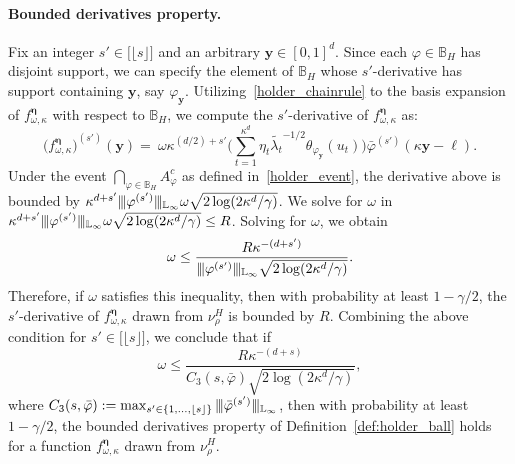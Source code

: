 \documentclass[twoside,11pt]{article}
\newcommand{\floor}[1]{\lfloor #1 \rfloor} %
\newcommand{\vectorize}[1]{\mathbf{#1}}
\newcommand{\dimDensity}{d} %
\newcommand{\smoothness}{s}
\newcommand{\ballRadius}{R}
\newcommand{\ONset}{\mathbb{B}}
\newcommand{\binNum}{\kappa}           %
\newcommand{\coef}{\theta}
\newcommand{\wavMotherUnivIndex}{\ell}
\newcommand{\wavMotherIndex}{\boldsymbol{\wavMotherUnivIndex}}
\newcommand{\domainTs}{
	[0,1]^{{\dimDensity}}
}
\begin{document}
\begin{appendix}
	\paragraph{Bounded derivatives property.}
	Fix an integer $s' \in \bigl[ \lfloor \smoothness \rfloor \bigr]$ and an arbitrary $\vectorize{y} \in \domainTs$.
	Since each $\varphi \in \ONset_{H}$ has disjoint support,
	we can specify the element of $\ONset_{H}$ whose $s'$-derivative has support containing  $\vectorize{y}$,
	say  $\varphi_{\vectorize{y}}$.
	Utilizing~\eqref{holder_chainrule} to the basis expansion of $f^{{\boldsymbol{\eta}}}_{\omega, \binNum}$ with respect to $\ONset_{H}$,
	we compute the $s'$-derivative of $f^{{\boldsymbol{\eta}}}_{\omega, \binNum}$ as:
	\begin{equation*}
		({f^{{\boldsymbol{\eta}}}_{\omega, \binNum})}^{(s')}(\vectorize{y})
		=~
		\omega
		\kappa^{(\dimDensity/2) + s'}
		\biggl(
		\sum_{t=1}^{\binNum^{\dimDensity}}
		\eta_t
		\tilde{\lambda_t}^{-1/2}
		\coef_{\varphi_{\vectorize{y}}}(u_t)
		\biggr)
		\bar{\varphi}
		^{(s')}
		(
		\kappa \vectorize{y} - \wavMotherIndex
		).
	\end{equation*}
	\noindent
	Under the event $\bigcap_{\varphi \in \ONset_H} A_\varphi^c$ as defined in~\eqref{holder_event},
	the derivative above is bounded by $\kappa^{\dimDensity + s'}
	\vert\kern-0.25ex
	\vert\kern-0.25ex
	\vert
	\varphi^{(s')}
	\vert\kern-0.25ex
	\vert\kern-0.25ex
	\vert_{\mathbb{L}_\infty}
	\omega \sqrt{2\log(2{\binNum^{\dimDensity}}/\gamma)}$.
	We solve for \(\omega\) in
	$\kappa^{\dimDensity + s'}
	\vert\kern-0.25ex
	\vert\kern-0.25ex
	\vert
	\varphi^{(s')}
	\vert\kern-0.25ex
	\vert\kern-0.25ex
	\vert_{\mathbb{L}_\infty}
	\omega \sqrt{2\log(2{\binNum^{\dimDensity}}/\gamma)} \leq \ballRadius$. Solving for $\omega$, we obtain
	\begin{equation}
		\omega
		\leq
		\frac{R\kappa^{-(\dimDensity+s')}}
		{
			\vert\kern-0.25ex
			\vert\kern-0.25ex
			\vert
			\varphi^{(s')}
			\vert\kern-0.25ex
			\vert\kern-0.25ex
			\vert_{\mathbb{L}_\infty}
			\sqrt{2\log(2{\binNum^{\dimDensity}}/\gamma)}
		}.
	\end{equation}
	\noindent
	Therefore, if \(\omega\) satisfies this inequality, then with probability at least \(1 - \gamma/2\), the $s'$-derivative of  \(f^{{\boldsymbol{\eta}}}_{\omega, \binNum}\) drawn from \(\nu_\rho^H\) is bounded by $\ballRadius$.
	Combining the above condition for  $s' \in \bigl[ \lfloor \smoothness \rfloor \bigr]$, 
	we conclude that if
	\begin{equation}\label{condition_holder_bounded_deriv}
		\omega \leq \frac{R\kappa^{-(\dimDensity+s)}
		}{
			C_3(\smoothness, \bar{\varphi}) 
			\sqrt{2 \log({2\binNum^{\dimDensity}}/\gamma)}},	
	\end{equation}
	where $C_3(\smoothness, \bar{\varphi}) := \max_{s' \in \{1, \ldots, \floor{s} \}}
	\vert\kern-0.25ex
	\vert\kern-0.25ex
	\vert
	\bar{\varphi}^{(s')}
	\vert\kern-0.25ex
	\vert\kern-0.25ex
	\vert_{\mathbb{L}_\infty}
	$,
	then with probability at least \(1 - \gamma/2\), the bounded derivatives property of Definition~\ref{def:holder_ball} holds for a function \(f^{{\boldsymbol{\eta}}}_{\omega, \binNum}\) drawn from \(\nu_\rho^H\).

\end{appendix}
\end{document}
